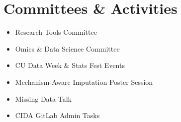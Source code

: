\documentclass[letterpaper]{twentysecondcv} %
\begin{document}
\section{Committees \& Activities}
\begin{itemize}
	\item Research Tools Committee
	\item Omics \& Data Science Committee
	\item CU Data Week \& Stats Fest Events
	\item Mechanism-Aware Imputation Poster Session
	\item Missing Data Talk
	\item CIDA GitLab Admin Tasks
\end{itemize}







\end{document}
